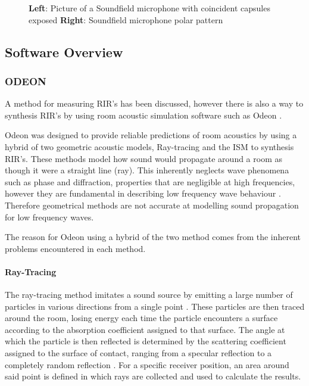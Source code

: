 \documentclass[../../main.tex]{subfiles}
\begin{document}
\begin{figure}[ht]
\begin{minipage}{0.5\textwidth}
				\end{minipage}
				\caption{\textbf{Left}: Picture of a Soundfield microphone with coincident capsules exposed \textbf{Right}: Soundfield microphone polar pattern \cite{soundFieldMic}}
				\label{sfMic}
			\end{figure}

\subsection{Software Overview}

	\subsubsection{ODEON}
	A method for measuring \ac{RIR}'s has been discussed, however there is also a way to synthesis \ac{RIR}'s by using room acoustic simulation software such as Odeon \cite{odeon}.

		Odeon was designed to provide reliable predictions of room acoustics by using a hybrid of two geometric acoustic models, Ray-tracing and the \ac{ISM} to synthesis \ac{RIR}'s. These methods model how sound would propagate around a room as though it were a straight line (ray). This inherently neglects wave phenomena such as phase and diffraction, properties that are negligible at high frequencies, however they are fundamental in describing low frequency wave behaviour \cite{Siltanen2010}. Therefore geometrical methods are not accurate at modelling sound propagation for low frequency waves.

		The reason for Odeon using a hybrid of the two method comes from the inherent problems encountered in each method.

	\paragraph{Ray-Tracing}
		The ray-tracing method imitates a sound source by emitting a large number of particles in various directions from a single point \cite{Rindel1995}. These particles are then traced around the room, losing energy each time the particle encounters a surface according to the absorption coefficient assigned to that surface. The angle at which the particle is then reflected is determined by the scattering coefficient assigned to the surface of contact, ranging from a specular reflection to a completely random reflection \cite{odeonManual}. For a specific receiver position, an area around said point is defined in which rays are collected and used to calculate the results.
\end{document}
